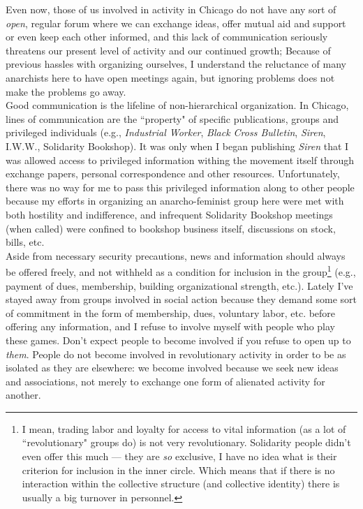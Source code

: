 \documentclass[12pt, onecolumn, letterpaper, oneside]{book}
\begin{document}
Even now, those of us involved in activity in Chicago do not have any sort of \emph{open}, regular forum where we can exchange ideas, offer mutual aid and support or even keep each other informed, and this lack of communication seriously threatens our present level of activity and our continued growth; Because of previous hassles with organizing ourselves, I understand the reluctance of many anarchists here to have open meetings again, but ignoring problems does not make the problems go away.\\
Good communication is the lifeline of non-hierarchical organization. In Chicago, lines of communication are the ``property" of specific publications, groups and privileged individuals (e.g., \emph{Industrial Worker}, \emph{Black Cross Bulletin}, \emph{Siren}, I.W.W., Solidarity Bookshop). It was only when I began publishing \emph{Siren} that I was allowed access to privileged information withing the movement itself through exchange papers, personal correspondence and other resources. Unfortunately, there was no way for me to pass this privileged information along to other people because my efforts in organizing an anarcho-feminist group here were met with both hostility and indifference, and infrequent Solidarity Bookshop meetings (when called) were confined to bookshop business itself, discussions on stock, bills, etc.\\
Aside from necessary security precautions, news and information should always be offered freely, and not withheld as a condition for inclusion in the group\footnote{I mean, trading labor and loyalty for access to vital information (as a lot of ``revolutionary" groups do) is not very revolutionary. Solidarity people didn't even offer this much --- they are \emph{so} exclusive, I have no idea what is their criterion for inclusion in the inner circle. Which means that if there is no interaction within the collective structure (and collective identity) there is usually a big turnover in personnel.} (e.g., payment of dues, membership, building organizational strength, etc.). Lately I've stayed away from groups involved in social action because they demand some sort of commitment in the form of membership, dues, voluntary labor, etc. before offering any information, and I refuse to involve myself with people who play these games. Don't expect people to become involved if you refuse to open up to \emph{them}. People do not become involved in revolutionary activity in order to be as isolated as they are elsewhere: we become involved because we seek new ideas and associations, not merely to exchange one form of alienated activity for another.\\
\end{document}

